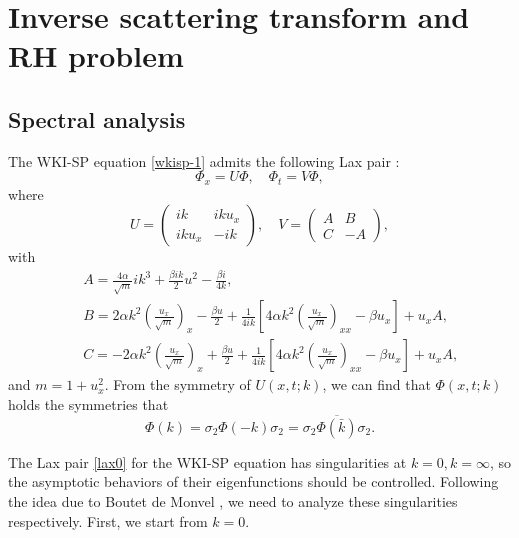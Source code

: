 \documentclass[11pt]{article}
\numberwithin{equation}{section}
\begin{document}
\section{Inverse scattering transform and RH problem}\label{sec2}
\subsection{Spectral analysis}\label{subs2.1}


The WKI-SP equation \eqref{wkisp-1} admits the following Lax pair \cite{Hu-2024}:
\begin{equation}\label{lax0}
  \Phi_x=U\Phi,\quad \Phi_t=V\Phi,
\end{equation}
where
\begin{equation}
    U=\left(\begin{array}{cc}
        ik & iku_x \\
        iku_x & -ik
    \end{array}\right),\quad V=\left(\begin{array}{cc}
        A  & B  \\
        C  & -A
    \end{array}\right),
\end{equation}
with
\begin{eqnarray*}
    &&A =\frac{4\alpha}{\sqrt{m}}ik^3+\frac{\beta ik}{2}u^2-\frac{\beta i}{4k},\\
    &&B =2\alpha k^2\left(\frac{u_x}{\sqrt{m}}\right)_x-\frac{\beta u}{2}+\frac{1}{4ik}\left[4\alpha k^2\left(\frac{u_x}{\sqrt{m}}\right)_{xx}-\beta u_x\right]+u_xA,\\
     &&C =-2\alpha k^2\left(\frac{u_x}{\sqrt{m}}\right)_x+\frac{\beta u}{2}+\frac{1}{4ik}\left[4\alpha k^2\left(\frac{u_x}{\sqrt{m}}\right)_{xx}-\beta u_x\right]+u_xA,
\end{eqnarray*}
and $m=1+u_x^2$. From the symmetry of $U(x,t;k)$, we can find that $\Phi(x,t;k)$ holds the symmetries that
\begin{equation}
    \Phi(k)=\sigma_2\Phi(-k)\sigma_2=\sigma_2\overline{\Phi(\bar{k})}\sigma_2.
\end{equation}

The Lax pair \eqref{lax0} for the WKI-SP equation has singularities at $k=0,k=\infty$, so the asymptotic behaviors of their eigenfunctions should be controlled. Following the idea due to Boutet de Monvel \cite{boutet-2017}, we need to analyze these singularities respectively. First, we start from $k=0$.
\end{document}
